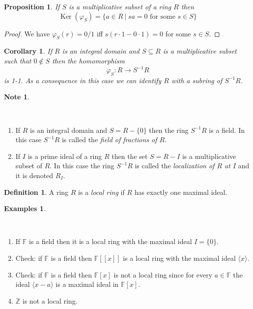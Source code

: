 \documentclass[12pt, letterpaper, oneside]{article}
\theoremstyle{plain}
\newtheorem{proposition}[theorem]{Proposition}
\newtheorem{corollary}[theorem]{Corollary}
\theoremstyle{definition}
\newtheorem{definition}[theorem]{Definition}
\newtheorem{examples}[theorem]{Examples}
\newtheorem{note}[theorem]{Note}
\newcommand{\Z}{{\mathbb Z}}
\newcommand{\F}{{\mathbb F}}
\newcommand{\Ker}{\operatorname{Ker}}
\newcommand{\subgp}[1]{\langle#1\rangle}
\newcommand{\benu}{\begin{enumerate}}
\newcommand{\eenu}{\end{enumerate}}
\newcommand{\vs}{\vskip 5mm}
\begin{document}
 
 \vs\vs 
 
 
 \begin{proposition}
 If $S$ is a multiplicative subset of a ring $R$ then 
 $$\Ker(\varphi_{S}) = \{a \in R \ | \ sa = 0 \text{ for some } s\in S\}$$
 \end{proposition}
 
 \vs
 \begin{proof}
 We have $\varphi_{S}(r) =  0/1$ iff $s(r\cdot 1 -0\cdot1) =0 $ for some $s\in S$.
 
 \end{proof}
 
 
 \vs\vs
 
 \begin{corollary}
 If $R$ is an integral domain and $S\subseteq R$ is a multiplicative subset 
 such that $0\not\in S$ then the homomorphism 
 $$\varphi_{S}\colon R\to S^{-1}R$$
 is 1-1. As a consequence in this case we can identify $R$ with a subring of $S^{-1}R$.
 \end{corollary}
 
 
 \vs\vs
 
 
 \begin{note}\ 
 
 \vskip -13mm
 
 \ 
 \benu
 \item If $R$ is an integral domain and $S= R-\{0\}$ then 
 the ring $S^{-1}R$ is a field.  In this case $S^{-1}R$ is called the 
 \emph{field of fractions of $R$}. 
 
 \item If $I$ is a prime ideal of a ring $R$ then the set $S= R-I$ is a multiplicative subset of $R$. 
 In this case the ring $S^{-1}R$ is called the \emph{localization of $R$ at $I$} and it is denoted 
 $R_{I}$.
 \eenu
 
 \end{note}
 
 \vs\vs
 
 
 \begin{definition}
 A ring $R$ is a \emph{local ring} if $R$ has exactly one maximal ideal. 
 \end{definition}
 
 \vs\vs
 
 \begin{examples}\ 
 
 \vskip -13mm
 
 \ 
 \benu
 \item If $\F$ is a field then it is a local ring with the maximal ideal $I= \{0\}$.
 \item Check: if $\F$ is a field then $\F[[x]]$ is a local ring with the maximal ideal $\subgp{x}$.
 \item Check: if $\F$ is a field then $\F[x]$ is not a local ring since for every $a\in \F$ the ideal 
 $\subgp{x-a}$ is a maximal ideal in $\F[x]$.
 \item $\Z$ is not a local ring. 
 \eenu
 
 \end{examples}
 
\end{document}
